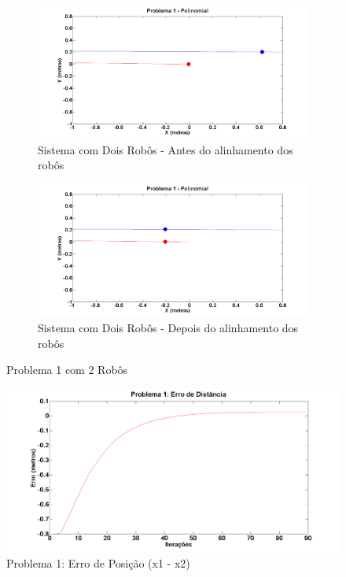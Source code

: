 \begin{figure}[!htb]
	\centering
	\begin{subfigure}{1.0\textwidth}
		\centering
		\includegraphics[width=.9\linewidth]{./Testes/Problema1/Polinomial/P1Antes}
		\caption{Sistema com Dois Robôs - Antes do alinhamento dos robôs}
		\label{fig:P12Ini}
	\end{subfigure}
	\begin{subfigure}{1.0\textwidth}
		\centering
		\includegraphics[width=.9\linewidth]{./Testes/Problema1/Polinomial/P1Depois}
		\caption{Sistema com Dois Robôs - Depois do alinhamento dos robôs}
		\label{fig:P12Fim}
	\end{subfigure}
	\caption{Problema 1 com 2 Robôs}
	\label{fig:sP12}
\end{figure}

\begin{figure}[!htb]
	\centering
	\includegraphics[width=.9\linewidth]{./Testes/Problema1/Incremental/ErroDistancia}
	\caption{Problema 1: Erro de Posição (x1 - x2)}
	\label{fig:P12Erro}
\end{figure}

